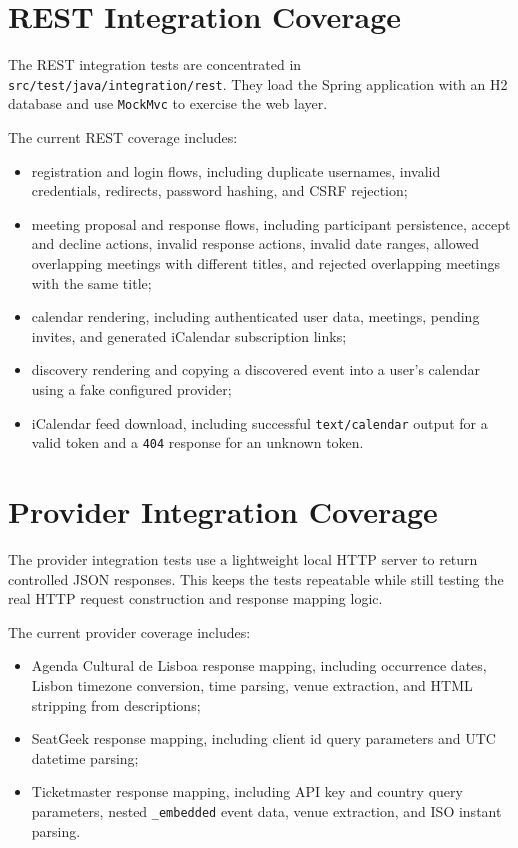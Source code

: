 \section{REST Integration Coverage}

The REST integration tests are concentrated in \texttt{src/test/java/integration/rest}. They load the Spring application with an H2 database and use \texttt{MockMvc} to exercise the web layer.

The current REST coverage includes:
\begin{itemize}
    \item registration and login flows, including duplicate usernames, invalid credentials, redirects, password hashing, and CSRF rejection;
    \item meeting proposal and response flows, including participant persistence, accept and decline actions, invalid response actions, invalid date ranges, allowed overlapping meetings with different titles, and rejected overlapping meetings with the same title;
    \item calendar rendering, including authenticated user data, meetings, pending invites, and generated iCalendar subscription links;
    \item discovery rendering and copying a discovered event into a user's calendar using a fake configured provider;
    \item iCalendar feed download, including successful \texttt{text/calendar} output for a valid token and a \texttt{404} response for an unknown token.
\end{itemize}

\section{Provider Integration Coverage}

The provider integration tests use a lightweight local HTTP server to return controlled JSON responses. This keeps the tests repeatable while still testing the real HTTP request construction and response mapping logic.

The current provider coverage includes:
\begin{itemize}
    \item Agenda Cultural de Lisboa response mapping, including occurrence dates, Lisbon timezone conversion, time parsing, venue extraction, and HTML stripping from descriptions;
    \item SeatGeek response mapping, including client id query parameters and UTC datetime parsing;
    \item Ticketmaster response mapping, including API key and country query parameters, nested \texttt{\_embedded} event data, venue extraction, and ISO instant parsing.
\end{itemize}

